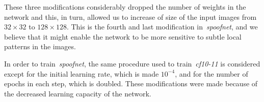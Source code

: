 These three modifications considerably dropped the number of weights in the network and this, in turn, allowed us to increase of size of the input images from $32\times32$ to $128\times128$. This is the fourth and last modification in~\emph{spoofnet}, and we believe that it might enable the network to be more sensitive to subtle local patterns in the images.

In order to train~\emph{spoofnet}, the same procedure used to train~\emph{cf10-11} is considered except for the initial learning rate, which is made $10^{-4}$, and for the number of epochs in each step, which is doubled. These modifications were made because of the decreased learning capacity of the network.







